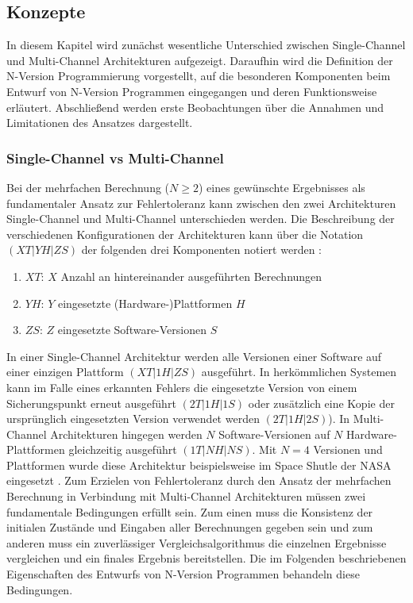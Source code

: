 \subsection{Konzepte} \label{konzepte}
%
In diesem Kapitel wird zunächst wesentliche Unterschied zwischen Single-Channel und Multi-Channel Architekturen aufgezeigt. Daraufhin wird die Definition der N-Version Programmierung vorgestellt, auf die besonderen Komponenten beim Entwurf von N-Version Programmen eingegangen und deren Funktionsweise erläutert. Abschließend werden erste Beobachtungen über die Annahmen und Limitationen des Ansatzes dargestellt.
\subsubsection{Single-Channel vs Multi-Channel} \label{channel}
%
%
Bei der mehrfachen Berechnung ($ N \geq 2 $)  eines gewünschte Ergebnisses als fundamentaler Ansatz zur Fehlertoleranz kann zwischen den zwei Architekturen Single-Channel und Multi-Channel unterschieden werden.
Die Beschreibung der verschiedenen Konfigurationen der Architekturen kann über die Notation $(XT|YH|ZS)$ der folgenden drei Komponenten notiert werden \cite{Avizienis:1985:NAF:1314034.1314064}:
\begin{enumerate}
	\item $XT$: $X$ Anzahl an hintereinander ausgeführten Berechnungen
	\item $YH$: $Y$ eingesetzte (Hardware-)Plattformen $H$
	\item $ZS$: $Z$ eingesetzte Software-Versionen $S$
\end{enumerate}
In einer Single-Channel Architektur werden alle Versionen einer Software auf einer einzigen Plattform $(XT|1H|ZS)$ ausgeführt. In herkömmlichen Systemen kann im Falle eines erkannten Fehlers die eingesetzte Version von einem Sicherungspunkt erneut ausgeführt $(2T|1H|1S)$ oder zusätzlich eine Kopie der ursprünglich eingesetzten Version verwendet werden $(2T|1H|2S)$).
In Multi-Channel Architekturen hingegen werden $N$ Software-Versionen auf $N$ Hardware-Plattformen gleichzeitig ausgeführt $(1T|NH|NS)$.
Mit $N=4$ Versionen und Plattformen wurde diese Architektur beispielsweise im Space Shutle der NASA eingesetzt \cite{conf/ifip/Goldberg80}.
Zum Erzielen von Fehlertoleranz durch den Ansatz der mehrfachen Berechnung in Verbindung mit Multi-Channel Architekturen müssen zwei fundamentale Bedingungen erfüllt sein. Zum einen muss die Konsistenz der initialen Zustände und Eingaben aller Berechnungen gegeben sein und zum anderen muss ein zuverlässiger Vergleichsalgorithmus die einzelnen Ergebnisse vergleichen und ein finales Ergebnis bereitstellen.
Die im Folgenden beschriebenen Eigenschaften des Entwurfs von N-Version Programmen behandeln diese Bedingungen.
%
%
